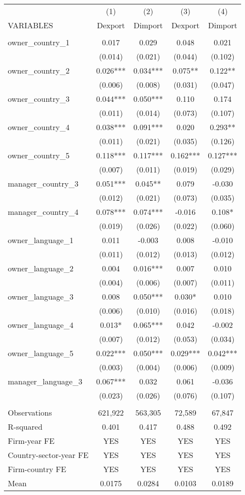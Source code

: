 \begin{tabular}{lcccc} \hline
 & (1) & (2) & (3) & (4) \\
VARIABLES & Dexport & Dimport & Dexport & Dimport \\ \hline
 &  &  &  &  \\
owner\_country\_1 & 0.017 & 0.029 & 0.048 & 0.021 \\
 & (0.014) & (0.021) & (0.044) & (0.102) \\
owner\_country\_2 & 0.026*** & 0.034*** & 0.075** & 0.122** \\
 & (0.006) & (0.008) & (0.031) & (0.047) \\
owner\_country\_3 & 0.044*** & 0.050*** & 0.110 & 0.174 \\
 & (0.011) & (0.014) & (0.073) & (0.107) \\
owner\_country\_4 & 0.038*** & 0.091*** & 0.020 & 0.293** \\
 & (0.011) & (0.021) & (0.035) & (0.126) \\
owner\_country\_5 & 0.118*** & 0.117*** & 0.162*** & 0.127*** \\
 & (0.007) & (0.011) & (0.019) & (0.029) \\
manager\_country\_3 & 0.051*** & 0.045** & 0.079 & -0.030 \\
 & (0.012) & (0.021) & (0.073) & (0.035) \\
manager\_country\_4 & 0.078*** & 0.074*** & -0.016 & 0.108* \\
 & (0.019) & (0.026) & (0.022) & (0.060) \\
owner\_language\_1 & 0.011 & -0.003 & 0.008 & -0.010 \\
 & (0.011) & (0.012) & (0.013) & (0.012) \\
owner\_language\_2 & 0.004 & 0.016*** & 0.007 & 0.010 \\
 & (0.004) & (0.006) & (0.007) & (0.011) \\
owner\_language\_3 & 0.008 & 0.050*** & 0.030* & 0.010 \\
 & (0.006) & (0.010) & (0.016) & (0.018) \\
owner\_language\_4 & 0.013* & 0.065*** & 0.042 & -0.002 \\
 & (0.007) & (0.012) & (0.053) & (0.034) \\
owner\_language\_5 & 0.022*** & 0.050*** & 0.029*** & 0.042*** \\
 & (0.003) & (0.004) & (0.006) & (0.009) \\
manager\_language\_3 & 0.067*** & 0.032 & 0.061 & -0.036 \\
 & (0.023) & (0.026) & (0.076) & (0.107) \\
 &  &  &  &  \\
Observations & 621,922 & 563,305 & 72,589 & 67,847 \\
R-squared & 0.401 & 0.417 & 0.488 & 0.492 \\
Firm-year FE & YES & YES & YES & YES \\
Country-sector-year FE & YES & YES & YES & YES \\
Firm-country FE & YES & YES & YES & YES \\
 Mean & 0.0175 & 0.0284 & 0.0103 & 0.0189 \\ \hline
\end{tabular}

